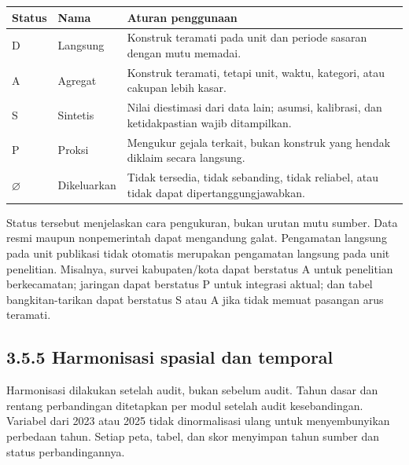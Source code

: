 \documentclass[
  indonesian,
  11pt,
  a4paper,
  oneside,
  openany]{report}
\newcounter{none} %
\begin{document}
{\def\LTcaptype{none} %
\begin{longtable}[]{@{}
  >{\raggedright\arraybackslash}p{}
  >{\raggedright\arraybackslash}p{}
  >{\raggedright\arraybackslash}p{}@{}}
\toprule\noalign{}
\begin{minipage}[b]{\linewidth}\raggedright
Status
\end{minipage} & \begin{minipage}[b]{\linewidth}\raggedright
Nama
\end{minipage} & \begin{minipage}[b]{\linewidth}\raggedright
Aturan penggunaan
\end{minipage} \\
\midrule\noalign{}
\endhead
\bottomrule\noalign{}
\endlastfoot
D & Langsung & Konstruk teramati pada unit dan periode sasaran dengan
mutu memadai. \\
A & Agregat & Konstruk teramati, tetapi unit, waktu, kategori, atau
cakupan lebih kasar. \\
S & Sintetis & Nilai diestimasi dari data lain; asumsi, kalibrasi, dan
ketidakpastian wajib ditampilkan. \\
P & Proksi & Mengukur gejala terkait, bukan konstruk yang hendak diklaim
secara langsung. \\
\(\varnothing\) & Dikeluarkan & Tidak tersedia, tidak sebanding, tidak
reliabel, atau tidak dapat dipertanggungjawabkan. \\
\end{longtable}
}

Status tersebut menjelaskan cara pengukuran, bukan urutan mutu sumber.
Data resmi maupun nonpemerintah dapat mengandung galat. Pengamatan
langsung pada unit publikasi tidak otomatis merupakan pengamatan
langsung pada unit penelitian. Misalnya, survei kabupaten/kota dapat
berstatus A untuk penelitian berkecamatan; jaringan dapat berstatus P
untuk integrasi aktual; dan tabel bangkitan-tarikan dapat berstatus S
atau A jika tidak memuat pasangan arus teramati.

\subsection{3.5.5 Harmonisasi spasial dan
temporal}\label{harmonisasi-spasial-dan-temporal}

Harmonisasi dilakukan setelah audit, bukan sebelum audit. Tahun dasar
dan rentang perbandingan ditetapkan per modul setelah audit
kesebandingan. Variabel dari 2023 atau 2025 tidak dinormalisasi ulang
untuk menyembunyikan perbedaan tahun. Setiap peta, tabel, dan skor
menyimpan tahun sumber dan status perbandingannya.
\end{document}
